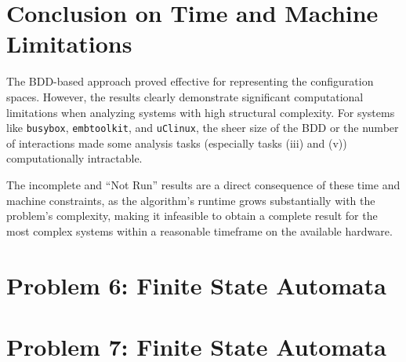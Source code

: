 \documentclass{article}
\begin{document}
\section{Conclusion on Time and Machine Limitations}
The BDD-based approach proved effective for representing the configuration spaces. However, the results clearly demonstrate significant computational limitations when analyzing systems with high structural complexity. For systems like \texttt{busybox}, \texttt{embtoolkit}, and \texttt{uClinux}, the sheer size of the BDD or the number of interactions made some analysis tasks (especially tasks (iii) and (v)) computationally intractable. 

The incomplete and ``Not Run'' results are a direct consequence of these time and machine constraints, as the algorithm's runtime grows substantially with the problem's complexity, making it infeasible to obtain a complete result for the most complex systems within a reasonable timeframe on the available hardware.

\vspace{1em}
\section*{Problem 6: Finite State Automata}
\setcounter{section}{0}

\vspace{1em}
\section*{Problem 7: Finite State Automata}
\setcounter{section}{0}
\end{document}
